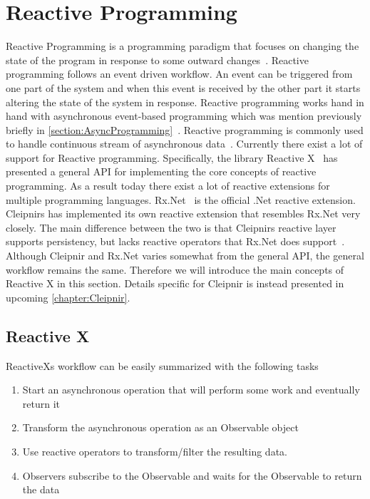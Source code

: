 \section{Reactive Programming}
\label{section:reactive}
Reactive Programming is a programming paradigm that focuses on changing the state of the program in response to some outward changes~\cite{WEB:RxProgIntro, DOC:Cleipnir}. 
Reactive programming follows an event driven workflow. An event can be triggered from one part of the system and when this event is received by the other part it starts altering the state of the system in response. Reactive programming works hand in hand with asynchronous event-based programming which was mention previously briefly in \autoref{section:AsyncProgramming}~\cite[p.~2-3]{BOOK:RxLinq}. Reactive programming is commonly used to handle continuous stream of asynchronous data~\cite{VIDEO:dotnetsheffReactive}.  
Currently there exist a lot of support for Reactive programming. Specifically, the library Reactive X~\cite{WEB:ReactiveXMainPage} has presented a general API for implementing the core concepts of reactive programming. As a result today  there exist a lot of reactive extensions for multiple programming languages. Rx.Net~\cite{Github:ReactiveExtensions} is the official .Net reactive extension. Cleipnirs has implemented its own reactive extension that resembles Rx.Net very closely. The main difference between the two is that Cleipnirs reactive layer supports persistency, but lacks reactive operators that Rx.Net does support~\cite{DOC:Cleipnir}. 
Although Cleipnir and Rx.Net varies somewhat from the general API, the general workflow remains the same. Therefore we will introduce the main concepts of Reactive X in this section. Details specific for Cleipnir is instead presented in upcoming \autoref{chapter:Cleipnir}.

\subsection{Reactive X}
ReactiveXs workflow can be easily summarized with the following tasks~\cite{WEB:ReactiveObservable}
\begin{enumerate}
	\item{Start an asynchronous operation that will perform some work and eventually return it}
	\item{Transform the asynchronous operation as an Observable object}
	\item{Use reactive operators to transform/filter the resulting data.}
	\item{Observers subscribe to the Observable and waits for the Observable to return the data}
\end{enumerate}

